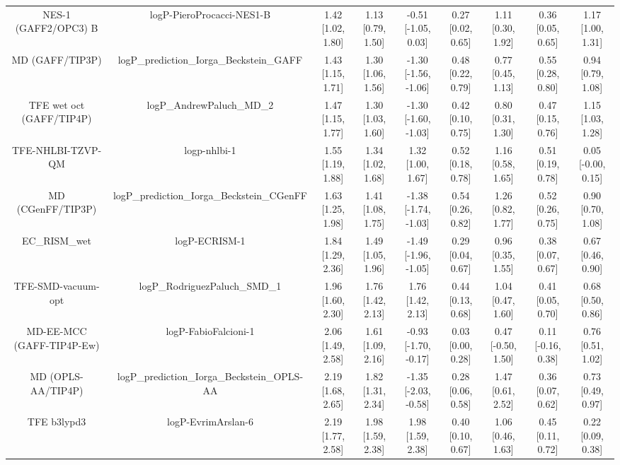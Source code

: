 \documentclass{article}
\begin{document}
\begin{center}
\begin{longtable}{|ccccccccc|}
        NES-1 (GAFF2/OPC3) B &                     logP-PieroProcacci-NES1-B & 1.42 [1.02, 1.80] & 1.13 [0.79, 1.50] &  -0.51 [-1.05, 0.03] & 0.27 [0.02, 0.65] &    1.11 [0.30, 1.92] &    0.36 [0.05, 0.65] &    1.17 [1.00, 1.31] \\
             MD (GAFF/TIP3P) &      logP\_prediction\_Iorga\_Beckstein\_GAFF & 1.43 [1.15, 1.71] & 1.30 [1.06, 1.56] & -1.30 [-1.56, -1.06] & 0.48 [0.22, 0.79] &    0.77 [0.45, 1.13] &    0.55 [0.28, 0.80] &    0.94 [0.79, 1.08] \\
    TFE wet oct (GAFF/TIP4P) &                     logP\_AndrewPaluch\_MD\_2 & 1.47 [1.15, 1.77] & 1.30 [1.03, 1.60] & -1.30 [-1.60, -1.03] & 0.42 [0.10, 0.75] &    0.80 [0.31, 1.30] &    0.47 [0.15, 0.76] &    1.15 [1.03, 1.28] \\
           TFE-NHLBI-TZVP-QM &                                  logp-nhlbi-1 & 1.55 [1.19, 1.88] & 1.34 [1.02, 1.68] &    1.32 [1.00, 1.67] & 0.52 [0.18, 0.78] &    1.16 [0.58, 1.65] &    0.51 [0.19, 0.78] &   0.05 [-0.00, 0.15] \\
           MD (CGenFF/TIP3P) &    logP\_prediction\_Iorga\_Beckstein\_CGenFF & 1.63 [1.25, 1.98] & 1.41 [1.08, 1.75] & -1.38 [-1.74, -1.03] & 0.54 [0.26, 0.82] &    1.26 [0.82, 1.77] &    0.52 [0.26, 0.75] &    0.90 [0.70, 1.08] \\
                 EC_RISM_wet &                                 logP-ECRISM-1 & 1.84 [1.29, 2.36] & 1.49 [1.05, 1.96] & -1.49 [-1.96, -1.05] & 0.29 [0.04, 0.67] &    0.96 [0.35, 1.55] &    0.38 [0.07, 0.67] &    0.67 [0.46, 0.90] \\
          TFE-SMD-vacuum-opt &                 logP\_RodriguezPaluch\_SMD\_1 & 1.96 [1.60, 2.30] & 1.76 [1.42, 2.13] &    1.76 [1.42, 2.13] & 0.44 [0.13, 0.68] &    1.04 [0.47, 1.60] &    0.41 [0.05, 0.70] &    0.68 [0.50, 0.86] \\
   MD-EE-MCC (GAFF-TIP4P-Ew) &                          logP-FabioFalcioni-1 & 2.06 [1.49, 2.58] & 1.61 [1.09, 2.16] & -0.93 [-1.70, -0.17] & 0.03 [0.00, 0.28] &   0.47 [-0.50, 1.50] &   0.11 [-0.16, 0.38] &    0.76 [0.51, 1.02] \\
          MD (OPLS-AA/TIP4P) &   logP\_prediction\_Iorga\_Beckstein\_OPLS-AA & 2.19 [1.68, 2.65] & 1.82 [1.31, 2.34] & -1.35 [-2.03, -0.58] & 0.28 [0.06, 0.58] &    1.47 [0.61, 2.52] &    0.36 [0.07, 0.62] &    0.73 [0.49, 0.97] \\
                 TFE b3lypd3 &                            logP-EvrimArslan-6 & 2.19 [1.77, 2.58] & 1.98 [1.59, 2.38] &    1.98 [1.59, 2.38] & 0.40 [0.10, 0.67] &    1.06 [0.46, 1.63] &    0.45 [0.11, 0.72] &    0.22 [0.09, 0.38] \\

\end{longtable}
\end{center}
\end{document}
